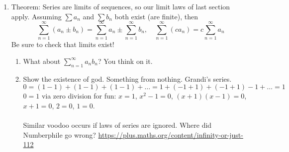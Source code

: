 \documentclass{article}
\begin{document}
\begin{enumerate}
\item Theorem: Series are limits of sequences, so our limit laws of last section apply. Assuming $\sum a_n$ and $\sum b_n$ both exist (are finite), then
$$
\sum_{n=1}^\infty(a_n\pm b_n) = \sum_{n=1}^\infty a_n \pm \sum_{n=1}^{\infty} b_n, \quad \sum_{n=1}^\infty(ca_n) = c \sum_{n=1}^\infty a_n
$$
Be sure to check that limits exist!
\begin{enumerate}
\item What about $\sum_{n=1}^\infty a_nb_n$? You think on it.
\item Show the existence of god. Something from nothing. Grandi's series.
\[
0 = (1-1)+(1-1)+(1-1)+\dots = 1+(-1+1)+(-1+1)-1+\dots=1
\]
$0=1$ via zero division for fun: $x=1$, $x^2-1=0$, $(x+1)(x-1)=0$, $x+1=0$, $2=0$, $1=0$. \\ \ \\
Similar voodoo occurs if laws of series are ignored. Where did Numberphile go wrong? \url{https://plus.maths.org/content/infinity-or-just-112}
\end{enumerate}
\end{enumerate}


\end{document}
